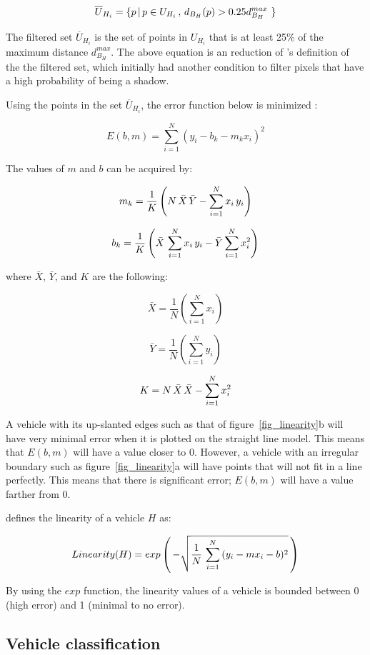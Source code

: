 \documentclass[conference]{IEEEtran}
\begin{document}
$$
\overline{U}_{H_i} = \lbrace p \thinspace | \thinspace p \in U_{H_i} \thinspace , \thinspace d_{B_H}(p) > 0.25 d_{B_H}^{max} \thinspace \thinspace \rbrace
$$

The filtered set $\overline{U}_{H_i}$ is the set of points in $U_{H_i}$ that is at least 25\% of the maximum distance $d_{B_H}^{max}$. The above equation is an reduction of \cite{Jun-Wei}'s definition of the the filtered set, which initially had another condition to filter pixels that have a high probability of being a shadow.


Using the points in the set $\overline{U}_{H_i}$, the error function below is minimized \cite{Math}:

$$
E(b, m) = \sum_{i=1}^{N}(y_i - b_k - m_k x_i)^2
$$

The values of $m$ and $b$ can be acquired by:

$$
m_k = \frac{1}{K} \left( N \thinspace \bar{X} \thinspace \bar{Y} - \sum_{i=1}^{N} x_i \thinspace y_i \right)
$$

$$
b_k = \frac{1}{K} \left( \bar{X} \thinspace \sum_{i=1}^{N} x_i \thinspace y_i - \bar{Y} \sum_{i=1}^{N} x_i^2 \right)
$$

where $\bar{X}$, $\bar{Y}$, and $K$ are the following:

$$
\bar{X} = \frac{1}{N} \left( \sum_{i=1}^{N} x_i \right)
$$

$$
\bar{Y} = \frac{1}{N} \left( \sum_{i=1}^{N} y_i \right)
$$

$$
K = N \thinspace \bar{X} \thinspace \bar{X} - \sum_{i=1}^{N} x_i^2
$$

A vehicle with its up-slanted edges such as that of figure~\ref{fig_linearity}b will have very minimal error when it is plotted on the straight line model. This means that $E(b,m)$ will have a value closer to 0. However, a vehicle with an irregular boundary such as figure~\ref{fig_linearity}a will have points that will not fit in a line perfectly. This means that there is significant error; $E(b,m)$ will have a value farther from 0.

\cite{Jun-Wei} defines the linearity of a vehicle $H$ as:

$$
Linearity(H) = exp \left( \thinspace - \sqrt{\frac{1}{N} \thinspace \sum_{i=1}^{N} \thinspace (y_i - m x_i - b)^2 } \thinspace \right)
$$

By using the $exp$ function, the linearity values of a vehicle is bounded between 0 (high error) and 1 (minimal to no error).


\subsection{Vehicle classification}
\end{document}
